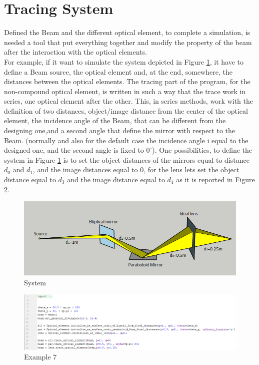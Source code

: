 \section{Tracing System}
Defined the Beam and the different optical element, to complete a simulation, is needed a tool that put everything together and modify the property of the beam after the interaction with the optical elements.
\\
For example, if it want to simulate the system depicted in Figure \ref{fig: System}, it have to define a Beam source, the optical element and, at the end, somewhere, the distances between the optical elements. The tracing part of the program, for the non-compound optical element, is written in such a way that the trace work in series, one optical element after the other. This, in series methods, work with the definition of two distances, object/image distance from the center of the optical element, the incidence angle of the Beam, that can be different from the designing one,and a second angle that define the mirror with respect to the Beam. (normally and also for the default case the incidence angle i equal to the designed one, and the second angle is fixed to $0^{\circ} $). One possibilities, to define the system in Figure \ref{fig: System} is to set the object distances of the mirrors equal to distance $d_0 $ and $d_1 $, and the image distances equal to $0 $, for the lens lets set the object distance equal to $d_3 $ and the image distance equal to $d_4 $ as it is reported in Figure \ref{fig: CodeSystem}.
\begin{figure}[H]
%
\centering
%
\includegraphics[width=1.0\textwidth]{Immagini/Chapter3/Cattura}
%
\caption{System}
%
\label{fig: System}
%
\end{figure}
\begin{figure}[H]
%
\centering
%
\includegraphics[width=1.\textwidth]{Immagini/Chapter3/CodeSystem}
%
\caption{Example 7}
%
\label{fig: CodeSystem}
%
\end{figure}
%
